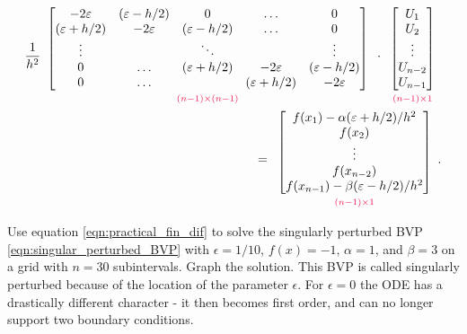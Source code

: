 \begin{align}
    \label{eqn:practical_fin_dif}
    \begin{split}
\frac{1}{h^2}
\begin{array}{c}
\begin{bmatrix}-2\epsilon & (\epsilon - h/2) &0&\hdots &0 \\ (\epsilon + h/2) &-2\epsilon & (\epsilon - h/2) &\hdots &0\\ \vdots &  & \ddots & &\vdots \\
0 & \hdots & (\epsilon + h/2) &-2\epsilon & (\epsilon - h/2) \\ 0 & \hdots & & (\epsilon + h/2) &-2\epsilon
\end{bmatrix}\\
{\scriptstyle\textcolor{red}{(n-1)\times(n-1)}}
\end{array}
\cdot
\begin{array}{c}
\begin{bmatrix}U_1\\U_2\\ \vdots \\U_{n-2} \\U_{n-1}\end{bmatrix}\\
{\scriptstyle\textcolor{red}{(n-1)\times1}}
\end{array}\\
 =
 \begin{array}{c}
 \begin{bmatrix}f(x_1) -\alpha(\epsilon + h/2)/h^2 \\f(x_2)\\ \vdots \\ f(x_{n-2})\\ f(x_{n-1})-\beta(\epsilon - h/2)/h^2 \end{bmatrix}\\
 {\scriptstyle\textcolor{red}{(n-1)\times1}}
 \end{array}.
    \end{split}
\end{align}



\begin{problem}
Use equation \eqref{eqn:practical_fin_dif} to solve the singularly perturbed BVP \eqref{eqn:singular_perturbed_BVP} with $\epsilon = 1/10$, $f(x) = -1$, $\alpha=1$, and $\beta=3$ on a grid with $n=30$ subintervals. Graph the solution.
This BVP is called singularly perturbed because of the location of the parameter $\epsilon$.
For $\epsilon = 0$ the ODE has a drastically different character - it then becomes first order, and can no longer support two boundary conditions.
    \label{prob:finitedifference2:prob1}
\end{problem}

